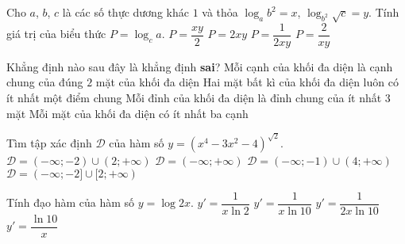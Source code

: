 \begin{ex}%
	Cho $a$, $b$, $c$ là các số thực dương khác $1$ và thỏa $\log_a b^2 = x$, $\log_{b^2} \sqrt{c} =y$. Tính giá trị của biểu thức $P=\log_c a$.
	\choice
	{$P=\dfrac{xy}{2}$}
	{$P=2xy$}
	{\True $P=\dfrac{1}{2xy}$}
	{$P=\dfrac{2}{xy}$}
\end{ex}

\begin{ex}%
	Khẳng định nào sau đây là khẳng định \textbf{sai}?
	\choice
	{Mỗi cạnh của khối đa diện là cạnh chung của đúng $2$ mặt của khối đa diện}
	{\True Hai mặt bất kì của khối đa diện luôn có ít nhất một điểm chung}
	{Mỗi đỉnh của khối đa diện là đỉnh chung của ít nhất $3$ mặt}
	{Mỗi mặt của khối đa diện có ít nhất ba cạnh}
\end{ex}

\begin{ex}%
	Tìm tập xác định $\mathscr{D}$ của hàm số $y=\left(x^4-3x^2-4\right)^{\sqrt{2}}$.
	\choice
	{\True $\mathscr{D}=(-\infty;-2)\cup (2;+\infty)$}
	{$\mathscr{D}=(-\infty;+\infty)$}
	{$\mathscr{D}=(-\infty;-1)\cup (4;+\infty)$}
	{$\mathscr{D}=(-\infty;-2]\cup [2;+\infty)$}
\end{ex}

\begin{ex}%
	Tính đạo hàm của hàm số $y=\log 2x$.
	\choice
	{$y'=\dfrac{1}{x \ln 2}$}
	{\True $y'=\dfrac{1}{x \ln 10}$}
	{$y'=\dfrac{1}{2 x \ln 10}$}
	{$y'=\dfrac{\ln 10}{x}$}
\end{ex}

